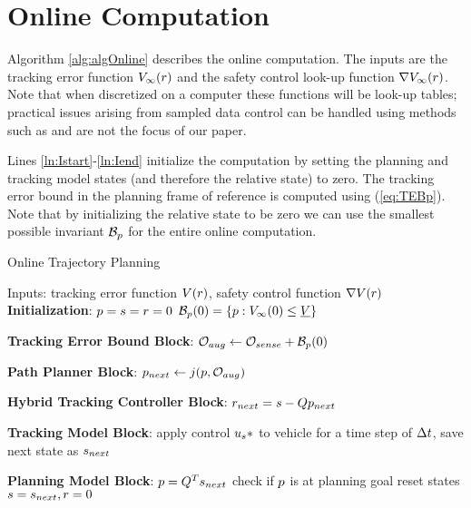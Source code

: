 \section{Online Computation \label{sec:online}}

Algorithm \ref{alg:algOnline} describes the online computation. The inputs are the tracking error function $V_\infty(r)$ and the safety control look-up function $\nabla V_\infty(r)$. Note that when discretized on a computer these functions will be look-up tables; practical issues arising from sampled data control can be handled using methods such as \cite{Mitchell2012, Mitchell13, Dabadie2014} and are not the focus of our paper.

Lines \ref{ln:Istart}-\ref{ln:Iend} initialize the computation by setting the planning and tracking model states (and therefore the relative state) to zero. The tracking error bound in the planning frame of reference is computed using (\ref{eq:TEBp}). Note that by initializing the relative state to be zero we can use the smallest possible invariant $\mathcal B_p$ for the entire online computation. 
\begin{algorithm}	
	\caption{Online Trajectory Planning}
	\label{alg:algOnline}
	\begin{algorithmic}[1]
		\STATE Inputs: tracking error function $V(r)$, safety control function $\nabla V(r)$
		\STATE \textbf{Initialization}: \label{ln:Istart}
		\STATE $p = s = r = 0$
		\STATE $\mathcal B_p(0) = \{p: V_\infty(0) \le \underline{V}\}$ \label{ln:Iend}
		
		\STATE \textbf{Tracking Error Bound Block}: \label{ln:obsStart}
		\STATE $\mathcal{O}_{aug} \leftarrow \mathcal{O}_{sense} + \mathcal B_p(0)$ \label{ln:obsEnd}
		
		\STATE \textbf{Path Planner Block}:\label{ln:plannerStart}
		\STATE $p_{next} \leftarrow j(p, \mathcal{O}_{aug})$\label{ln:plannerEnd}
		
		\STATE \textbf{Hybrid Tracking Controller Block}:\label{ln:controllerStart}
		\STATE $r_{next} = s - Qp_{next}$
		
		\ELSE {} \ENDIF \label{ln:controllerEnd}
		
		\STATE \textbf{Tracking Model Block}: \label{ln:trackingStart}
		\STATE apply control $u_s*$ to vehicle for a time step of $\Delta t$, save next state as $s_{next}$ \label{ln:trackingEnd}
		
		\STATE \textbf{Planning Model Block}:\label{ln:planningStart}
		\STATE $p = Q^Ts_{next}$
		\STATE check if $p$ is at planning goal
		\STATE reset states $s = s_{next}, r = 0$ \label{ln:planningEnd}
		\ENDWHILE
	\end{algorithmic}
\end{algorithm}
